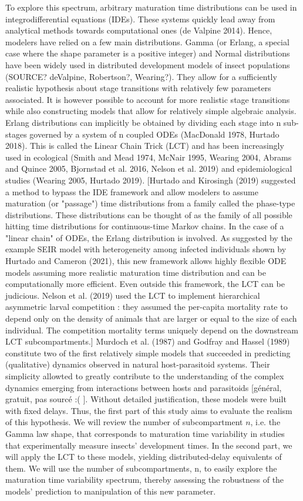 \documentclass[12pt,a4paper,onecolumn]{article}
\begin{document}
\tabto{1 cm} To explore this spectrum, arbitrary maturation time distributions can be used in integrodifferential equations (IDEs). These systems quickly lead away from analytical methods towards computational ones (de Valpine 2014). Hence, modelers have relied on a few main distributions. Gamma (or Erlang, a special case where the shape parameter is a positive integer) and Normal distributions have been widely used in distributed development models of insect populations (SOURCE? deValpine, Robertson?, Wearing?). They allow for a sufficiently realistic hypothesis about stage transitions with relatively few parameters associated. It is however possible to account for more realistic stage transitions while also constructing models that allow for relatively simple algebraic analysis. Erlang distributions can implicitly be obtained by dividing each stage into n sub-stages governed by a system of n coupled ODEs (MacDonald 1978, Hurtado 2018). This is called the Linear Chain Trick (LCT) and has been increasingly used in ecological (Smith and Mead 1974, McNair 1995, Wearing 2004, Abrams and Quince 2005, Bjornstad et al. 2016, Nelson et al. 2019) and epidemiological studies (Wearing 2005, Hurtado 2019).
 [Hurtado and Kirosingh (2019) suggested a method to bypass the IDE framework and allow modelers to assume maturation (or "passage") time distributions from a family called the phase-type distributions. These distributions can be thought of as the family of all possible hitting time distributions for continuous-time Markov chains. In the case of a "linear chain" of ODEs, the Erlang distribution is involved. As suggested by the example SEIR model with heterogeneity among infected individuals shown by Hurtado and Cameron (2021), this new framework allows highly flexible ODE models assuming more realistic maturation time distribution and can be computationally more efficient. Even outside this framework, the LCT can be judicious. Nelson et al. (2019) used the LCT to implement hierarchical asymmetric larval competition : they assumed the per-capita mortality rate to depend only on the density of animals that are larger or equal to the size of each individual. The competition mortality terms uniquely depend on the downstream LCT subcompartments.]
\tabto{1 cm} Murdoch et al. (1987) and Godfray and Hassel (1989) constitute two of the first relatively simple models that succeeded in predicting (qualitative) dynamics observed in natural host-parasitoid systems. Their simplicity allowted to greatly contribute to the understanding of the complex dynamics emerging from interactions between hosts and parasitoids [général, gratuit, pas sourcé :( ]. Without detailed justification, these models were built with fixed delays. Thus, the first part of this study aims to evaluate the realism of this hypothesis. We will review the number of subcompartment $n$, i.e. the Gamma law shape, that corresponds to maturation time variability in studies that experimentally measure insects' development times. In the second part, we will apply the LCT to these models, yielding distributed-delay equivalents of them. We will use the number of subcompartments, n, to easily explore the maturation time variability spectrum, thereby assessing the robustness of the models' prediction to manipulation of this new parameter.
\end{document}
